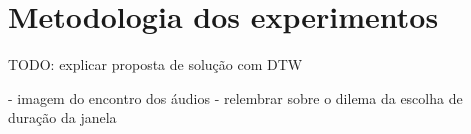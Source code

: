 \section{Metodologia dos experimentos}
\label{sec:dtw-metodology}


TODO: explicar proposta de solução com DTW

- imagem do encontro dos áudios
- relembrar sobre o dilema da escolha de duração da janela